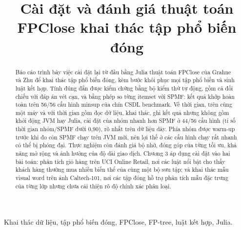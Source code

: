 \documentclass[conference]{IEEEtran}
\begin{document}
\title{Cài đặt và đánh giá thuật toán FPClose khai thác tập phổ biến đóng}

\author{
}

\maketitle

\begin{abstract}
Báo cáo trình bày việc cài đặt lại từ đầu bằng Julia thuật toán FPClose của Grahne và Zhu 
để khai thác tập phổ biến đóng, kèm bước khôi phục mọi tập phổ biến và sinh luật kết hợp. Tính đúng
đắn được kiểm chứng bằng bộ kiểm thử tự động, gồm cả đối chiếu với đáp án vét cạn, và bằng phép so từng itemset với
SPMF: kết quả khớp hoàn toàn trên 56/56 cấu hình minsup của chín CSDL benchmark.
Về thời gian, trên cùng một máy và với thời gian gồm đọc dữ liệu, khai thác, ghi kết quả nhưng không gồm khởi động JVM
hay Julia, cài đặt của nhóm nhanh hơn SPMF ở 44/56 cấu hình (tỉ số thời gian nhóm/SPMF dưới 0,90), rõ nhất trên dữ liệu
dày. Phía nhóm được warm-up trước khi đo còn SPMF chạy trên JVM mới, nên lợi thế ở các cấu hình chạy rất nhanh có thể
bị phóng đại. Thực nghiệm còn
đánh giá bộ nhớ, đóng góp của từng tối ưu, khả năng mở rộng và ảnh hưởng của độ dài giao dịch. Chương 3 áp dụng cài đặt vào hai bài toán: phân tích giỏ hàng trên UCI Online Retail, nơi các luật nổi bật cho thấy khách hàng thường mua nhiều biến thể của cùng một bộ sưu tập; và khai thác mẫu visual word trên ảnh Caltech-101, nơi các tập đóng hỗ trợ phân tích mẫu đặc trưng của từng lớp nhưng chưa cải thiện rõ độ chính xác phân loại.
\end{abstract}

\begin{IEEEkeywords}
Khai thác dữ liệu, tập phổ biến đóng, FPClose, FP-tree, luật kết hợp, Julia.
\end{IEEEkeywords}

\end{document}
